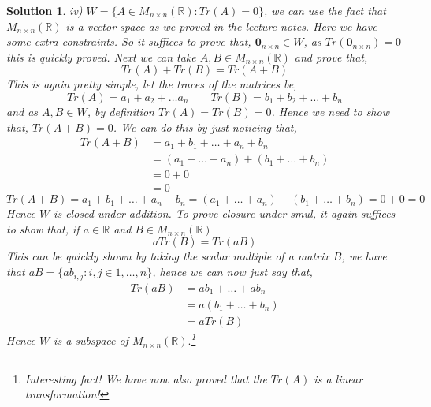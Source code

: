 \documentclass{article}
\newcommand{\R}{\mathbb{R}}
\renewcommand{\vec}[1]{\boldsymbol{\mathbf{#1}}}
\newtheorem{solution}{Solution}
\begin{document}
\begin{solution}
  \noindent
  iv) $W = \{A \in M_{n \times n}(\R) : Tr(A) = 0\}$, we can use the fact that $M_{n \times n}(\R)$ is a vector space as we proved in the lecture notes. Here we have some extra constraints. So it suffices to prove that, $\vec 0_{n \times n} \in W$, as $Tr(\vec 0_{n\times n}) = 0$ this is quickly proved. Next we can take $A, B \in M_{n\times n}(\R)$ and prove that,
  $$ Tr(A) + Tr(B) = Tr(A + B) $$
  This is again pretty simple, let the traces of the matrices be,
  $$ Tr(A) = a_1 + a_2 + \dots a_n \qquad Tr(B) = b_1 + b_2 + \dots + b_n $$
  and as $A, B \in W$, by definition $Tr(A) = Tr(B) = 0$. Hence we need to show that, $Tr(A + B) = 0$. We can do this by just noticing that,
  \begin{align*}
    Tr(A + B) &= a_1 + b_1 + \dots + a_n + b_n\\
    &= (a_1 + \dots + a_n) + (b_1 + \dots + b_n) \\
    &= 0 + 0 \\
    &= 0
  \end{align*}
  $$ Tr(A + B) = a_1 + b_1 + \dots + a_n + b_n = (a_1 + \dots + a_n) + (b_1 + \dots + b_n) = 0 + 0 = 0  $$
  Hence $W$ is closed under addition. To prove closure under smul, it again suffices to show that, if $a \in \R$ and $B \in M_{n\times n}(\R)$
  $$ aTr(B) = Tr(aB) $$
  This can be quickly shown by taking the scalar multiple of a matrix $B$, we have that $aB = \{ab_{i, j} : i, j \in {1, \dots, n}\}$, hence we can now just say that,
  \begin{align*}
    Tr(aB) &= ab_1 + \dots + ab_n\\
    &= a(b_1 + \dots + b_n)\\
    &= aTr(B)
  \end{align*}
  Hence $W$ is a subspace of $M_{n\times n}(\R).$\footnote{Interesting fact! We have now also proved that the $Tr(A)$ is a linear transformation!}
\end{solution}
\end{document}
